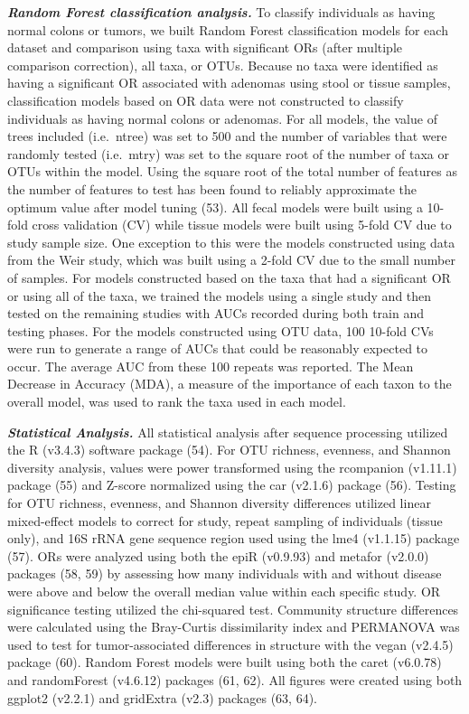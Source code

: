 \documentclass[12pt,]{article}
\begin{document}
\textbf{\emph{Random Forest classification analysis.}} To classify
individuals as having normal colons or tumors, we built Random Forest
classification models for each dataset and comparison using taxa with
significant ORs (after multiple comparison correction), all taxa, or
OTUs. Because no taxa were identified as having a significant OR
associated with adenomas using stool or tissue samples, classification
models based on OR data were not constructed to classify individuals as
having normal colons or adenomas. For all models, the value of trees
included (i.e.~ntree) was set to 500 and the number of variables that
were randomly tested (i.e.~mtry) was set to the square root of the
number of taxa or OTUs within the model. Using the square root of the
total number of features as the number of features to test has been
found to reliably approximate the optimum value after model tuning (53).
All fecal models were built using a 10-fold cross validation (CV) while
tissue models were built using 5-fold CV due to study sample size. One
exception to this were the models constructed using data from the Weir
study, which was built using a 2-fold CV due to the small number of
samples. For models constructed based on the taxa that had a significant
OR or using all of the taxa, we trained the models using a single study
and then tested on the remaining studies with AUCs recorded during both
train and testing phases. For the models constructed using OTU data, 100
10-fold CVs were run to generate a range of AUCs that could be
reasonably expected to occur. The average AUC from these 100 repeats was
reported. The Mean Decrease in Accuracy (MDA), a measure of the
importance of each taxon to the overall model, was used to rank the taxa
used in each model.

\textbf{\emph{Statistical Analysis.}} All statistical analysis after
sequence processing utilized the R (v3.4.3) software package (54). For
OTU richness, evenness, and Shannon diversity analysis, values were
power transformed using the rcompanion (v1.11.1) package (55) and
Z-score normalized using the car (v2.1.6) package (56). Testing for OTU
richness, evenness, and Shannon diversity differences utilized linear
mixed-effect models to correct for study, repeat sampling of individuals
(tissue only), and 16S rRNA gene sequence region used using the lme4
(v1.1.15) package (57). ORs were analyzed using both the epiR (v0.9.93)
and metafor (v2.0.0) packages (58, 59) by assessing how many individuals
with and without disease were above and below the overall median value
within each specific study. OR significance testing utilized the
chi-squared test. Community structure differences were calculated using
the Bray-Curtis dissimilarity index and PERMANOVA was used to test for
tumor-associated differences in structure with the vegan (v2.4.5)
package (60). Random Forest models were built using both the caret
(v6.0.78) and randomForest (v4.6.12) packages (61, 62). All figures were
created using both ggplot2 (v2.2.1) and gridExtra (v2.3) packages (63,
64).
\end{document}
